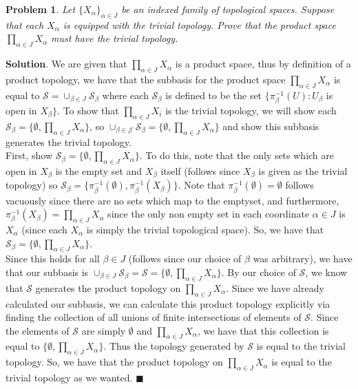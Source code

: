 \documentclass[12pt]{article}
\renewcommand{\=}[1]{\stackrel{#1}{=}} %
\newtheorem{p}{Problem}[section]
\theoremstyle{definition}
\newenvironment{s}{%
        \begin{trivlist} \item \textbf{Solution}. }{%
            \hspace*{\fill} $\blacksquare$\end{trivlist}}%
\begin{document}
\newpage

\begin{p}
    Let $\{X_{\alpha}\}_{\alpha\in J}$ be an indexed family of topological spaces. Suppose that each $X_{\alpha}$ is equipped with the trivial
    topology. Prove that the product space $\prod_{\alpha\in J}X_{\alpha}$ must have the trivial topology.
\end{p}
\begin{s}
    We are given that $\prod_{\alpha\in J} X_{\alpha}$ is a product space, thus by definition of a product topology, we have that the subbasis for
    the product space $\prod_{\alpha\in J} X_{\alpha}$ is equal to $\mathcal{S} = \cup_{\beta\in J} \mathcal{S}_{\beta}$ where each $\mathcal{S}_{\beta}$
    is defined to be the set $\{\pi_{\beta}^{-1}(U): U_{\beta}$ is open in $X_{\beta}\}$. To show that $\prod_{\alpha\in J} X_i$ is the trivial topology,
    we will show each $\mathcal{S}_{\beta} = \{\emptyset, \prod_{\alpha\in J} X_{\alpha}\}$, so $\cup_{\mathcal{\beta\in J}} \mathcal{S}_{\beta} = 
    \{\emptyset, \prod_{\alpha\in J} X_{\alpha}\}$ and show this subbasis generates the trivial topology.\\
    First, show $\mathcal{S}_{\beta} = \{\emptyset, \prod_{\alpha\in J} X_{\alpha}\}$. To do this, note that the only sets which are open in $X_{\beta}$
    is the empty set and $X_{\beta}$ itself (follows since $X_{\beta}$ is given as the trivial topology) so $\mathcal{S}_{\beta} = \{\pi_{\beta}^{-1}(\emptyset),
    \pi_{\beta}^{-1}(X_{\beta})\}$. Note that $\pi_{\beta}^{-1}(\emptyset) = \emptyset$ follows vacuously since there are no sets which map to the emptyset, and
    furthermore, $\pi_{\beta}^{-1}(X_{\beta}) = \prod_{\alpha\in J}X_{\alpha}$ since the only non empty set in each coordinate $\alpha\in J$ is $X_{\alpha}$ (since
    each $X_{\alpha}$ is simply the trivial topological space). So, we have that $\mathcal{S}_{\beta} = \{\emptyset, \prod_{\alpha\in J} X_{\alpha}\}$.\\
    Since this holds for all $\beta\in J$ (follows since our choice of $\beta$ was arbitrary), we have that our subbasis is 
    $\cup_{\beta\in J} \mathcal{S}_{\beta} = \mathcal{S} = \{\emptyset,\prod_{\alpha\in J} X_{\alpha}\}$. By our choice of $\mathcal{S}$, we know that
    $\mathcal{S}$ generates the product topology on $\prod_{\alpha\in J} X_{\alpha}$. Since we have already calculated our subbasis, we can calculate this
    product topology explicitly via finding the collection of all unions of finite intersections of elements of $\mathcal{S}$. Since the elements of
    $\mathcal{S}$ are simply $\emptyset$ and $\prod_{\alpha\in J} X_{\alpha}$, we have that this collection is equal to $\{\emptyset, \prod_{\alpha\in J} X_{\alpha}\}$.
    Thus the topology generated by $\mathcal{S}$ is equal to the trivial topology. So, we have that the product topology on $\prod_{\alpha\in J} X_{\alpha}$ is equal
    to the trivial topology as we wanted.
\end{s}
\end{document}
